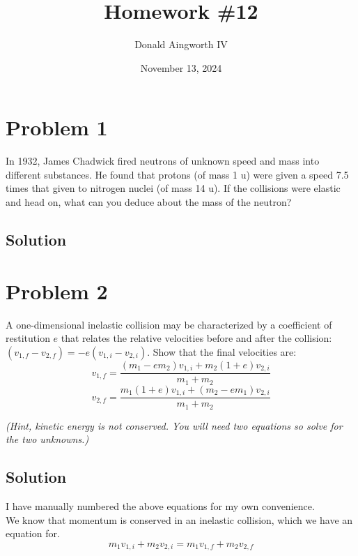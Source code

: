 \documentclass[12pt]{article}
\title{Homework \#12}
\author{Donald Aingworth IV}
\date{November 13, 2024}
\begin{document}

\maketitle

\pagebreak

\section*{Problem 1}
In 1932, James Chadwick fired neutrons of unknown speed and mass into different
substances. He found that protons (of mass 1 u) were given a speed 7.5 times that given to
nitrogen nuclei (of mass 14 u). If the collisions were elastic and head on, what can you deduce
about the mass of the neutron?

\subsection*{Solution}


\pagebreak
\section*{Problem 2}
A one-dimensional inelastic collision may be characterized by a coefficient of restitution $e$ that relates the relative velocities before and after the collision: $(v_{1,f} - v_{2,f}) = -e(v_{1,i} - v_{2,i})$. Show that the final velocities are:
\begin{equation}
    v_{1,f} = \frac{(m_1 - em_2)v_{1,i} + m_2(1 + e)v_{2,i}}{m_1 + m_2}
\end{equation}
\begin{equation}
    v_{2,f} = \frac{m_1(1 + e)v_{1,i} + (m_2 - em_1)v_{2,i}}{m_1 + m_2}
\end{equation}

\textit{(Hint, kinetic energy is not conserved. You will need two equations so solve for the two unknowns.)}
\subsection*{Solution}
I have manually numbered the above equations for my own convenience.\\
We know that momentum is conserved in an inelastic collision, which we have an equation for.
\begin{equation}
    m_1v_{1,i} + m_2v_{2,i} = m_1v_{1,f} + m_2v_{2,f} 
\end{equation}
\end{document}
